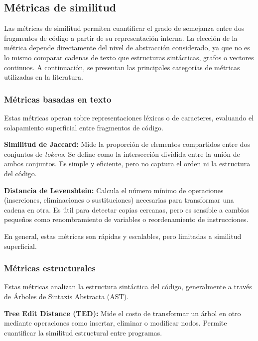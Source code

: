 \subsection{Métricas de similitud}

Las métricas de similitud permiten cuantificar el grado de semejanza entre dos fragmentos de código a partir de su representación interna. La elección de la métrica depende directamente del nivel de abstracción considerado, ya que no es lo mismo comparar cadenas de texto que estructuras sintácticas, grafos o vectores continuos. A continuación, se presentan las principales categorías de métricas utilizadas en la literatura.

\subsubsection{Métricas basadas en texto}

Estas métricas operan sobre representaciones léxicas o de caracteres, evaluando el solapamiento superficial entre fragmentos de código.

\textbf{Similitud de Jaccard:} Mide la proporción de elementos compartidos entre dos conjuntos de \textit{tokens}. Se define como la intersección dividida entre la unión de ambos conjuntos. Es simple y eficiente, pero no captura el orden ni la estructura del código.

\textbf{Distancia de Levenshtein:} Calcula el número mínimo de operaciones (inserciones, eliminaciones o sustituciones) necesarias para transformar una cadena en otra. Es útil para detectar copias cercanas, pero es sensible a cambios pequeños como renombramiento de variables o reordenamiento de instrucciones.

En general, estas métricas son rápidas y escalables, pero limitadas a similitud superficial.

\subsubsection{Métricas estructurales}

Estas métricas analizan la estructura sintáctica del código, generalmente a través de Árboles de Sintaxis Abstracta (AST).

\textbf{Tree Edit Distance (TED):} Mide el costo de transformar un árbol en otro mediante operaciones como insertar, eliminar o modificar nodos. Permite cuantificar la similitud estructural entre programas.

